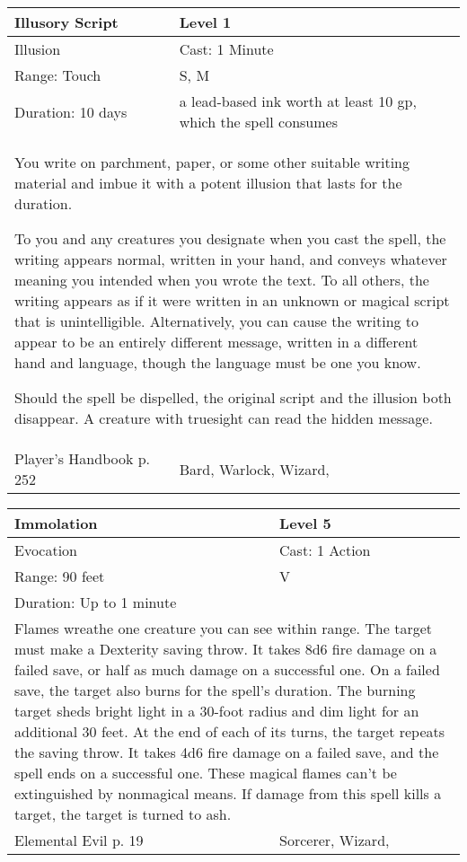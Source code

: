 \documentclass[11pt]{report}
\begin{document}
\begin{table}[H]
	\begin{tabular}{||p{6cm}|p{6cm}||}
		\hline\hline
		\bf{Illusory Script} & Level 1\\ \hline
		Illusion & Cast: 1 Minute\\ \hline
		Range: Touch & S, M\\ \hline
		Duration: 10 days & a lead-based ink worth at least 10 gp, which the spell consumes\\ \hline
		\multicolumn{2}{||p{12cm}||}{You write on parchment, paper, or some other suitable writing material and imbue it with a potent illusion that lasts for the duration.

To you and any creatures you designate when you cast the spell, the writing appears normal, written in your hand, and conveys whatever meaning you intended when you wrote the text. To all others, the writing appears as if it were written in an unknown or magical script that is unintelligible. Alternatively, you can cause the writing to appear to be an entirely different message, written in a different hand and language, though the language must be one you know.

Should the spell be dispelled, the original script and the illusion both disappear.
A creature with truesight can read the hidden message.}\\ \hline
Player's Handbook p. 252 & Bard, Warlock, Wizard, \\ \hline\hline
	\end{tabular}
\end{table}

\begin{table}[H]
	\begin{tabular}{||p{6cm}|p{6cm}||}
		\hline\hline
		\bf{Immolation} & Level 5\\ \hline
		Evocation & Cast: 1 Action\\ \hline
		Range: 90 feet & V\\ \hline
		Duration: Up to 1 minute & \\ \hline
		\multicolumn{2}{||p{12cm}||}{Flames wreathe one creature you can see within range. The target must make a Dexterity saving throw. It takes 8d6 fire damage on a failed save, or half as much damage on a successful one. On a failed save, the target also burns for the spell’s duration. The burning target sheds bright light in a 30-foot radius and dim light for an additional 30 feet. At the end of each of its turns, the target repeats the saving throw. It takes 4d6 fire damage on a failed save, and the spell ends on a successful one. These magical flames can’t be extinguished by nonmagical means.
If damage from this spell kills a target, the target is turned to ash.}\\ \hline
Elemental Evil p. 19 & Sorcerer, Wizard, \\ \hline\hline
	\end{tabular}
\end{table}
\end{document}

